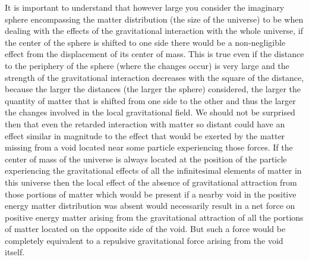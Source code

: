 \documentclass[notitlepage,12pt]{report}
\begin{document}
It is important to understand that however large you consider the imaginary sphere encompassing the matter distribution (the size of the universe) to be when dealing with the effects of the gravitational interaction with the whole universe, if the center of the sphere is shifted to one side there would be a non-negligible effect from the displacement of its center of mass. This is true even if the distance to the periphery of the sphere (where the changes occur) is very large and the strength of the gravitational interaction decreases with the square of the distance, because the larger the distances (the larger the sphere) considered, the larger the quantity of matter that is shifted from one side to the other and thus the larger the changes involved in the local gravitational field. We should not be surprised then that even the retarded interaction with matter so distant could have an effect similar in magnitude to the effect that would be exerted by the matter missing from a void located near some particle experiencing those forces. If the center of mass of the universe is always located at the position of the particle experiencing the gravitational effects of all the infinitesimal elements of matter in this universe then the local effect of the absence of gravitational attraction from those portions of matter which would be present if a nearby void in the positive energy matter distribution was absent would necessarily result in a net force on positive energy matter arising from the gravitational attraction of all the portions of matter located on the opposite side of the void. But such a force would be completely equivalent to a repulsive gravitational force arising from the void itself.
\end{document}
